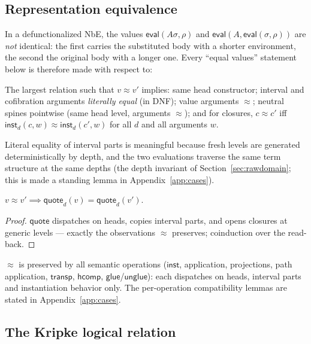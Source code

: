 \documentclass{lmcs}
\newcommand{\transp}{\mathsf{transp}}
\newcommand{\hcomp}{\mathsf{hcomp}}
\newcommand{\glue}{\mathsf{glue}}
\newcommand{\unglue}{\mathsf{unglue}}
\newcommand{\repeq}{\approx}
\newcommand{\evalop}{\mathsf{eval}}
\newcommand{\quo}{\mathsf{quote}}
\newcommand{\capp}{\mathsf{inst}}
\begin{document}
\subsection{Representation equivalence}
\label{sec:repeq}

In a defunctionalized NbE, the values $\evalop(A\sigma, \rho)$ and
$\evalop(A, \evalop(\sigma,\rho))$ are \emph{not} identical: the
first carries the substituted body with a shorter environment, the
second the original body with a longer one.  Every ``equal values''
statement below is therefore made with respect to:

\begin{defi}[Representation equivalence $\repeq$]\label{def:repeq}
  The largest relation such that $v \repeq v'$ implies: same head
  constructor; interval and cofibration arguments \emph{literally
  equal} (in DNF); value arguments $\repeq$; neutral spines pointwise
  (same head level, arguments $\repeq$); and for closures,
  $c \repeq c'$ iff $\capp_d(c, w) \repeq \capp_d(c', w)$ for all
  $d$ and all arguments $w$.
\end{defi}

\noindent Literal equality of interval parts is meaningful because
fresh levels are generated deterministically by depth, and the two
evaluations traverse the same term structure at the same depths
(the depth invariant of Section~\ref{sec:rawdomain}; this is made a
standing lemma in Appendix~\ref{app:cases}).

\begin{lem}\label{lem:readback}
  $v \repeq v' \implies \quo_d(v) = \quo_d(v')$.
\end{lem}
\begin{proof}
  $\quo$ dispatches on heads, copies interval parts, and opens
  closures at generic levels --- exactly the observations $\repeq$
  preserves; coinduction over the read-back.
\end{proof}

\noindent $\repeq$ is preserved by all semantic operations
($\capp$, application, projections, path application, $\transp$,
$\hcomp$, $\glue$/$\unglue$): each dispatches on heads, interval
parts and instantiation behavior only.  The per-operation
compatibility lemmas are stated in Appendix~\ref{app:cases}.

\subsection{The Kripke logical relation}
\label{sec:valeq}
\end{document}
